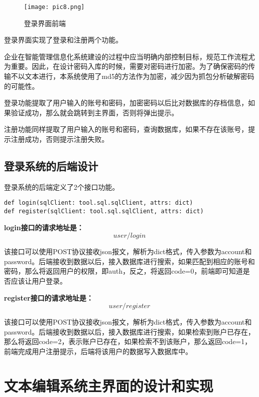 \documentclass[forprint]{software}
\begin{document}
\begin{figure}[!htbp]
	\centering
	\texttt{[image: pic8.png]}
	\caption{登录界面前端}
	\label{fig:8}
\end{figure}

登录界面实现了登录和注册两个功能。

企业在智能管理信息化系统建设的过程中应当明确内部控制目标，规范工作流程尤为重要。因此，在设计密码入库的时候，需要对密码进行加密。为了确保密码的传输不以文本进行，本系统使用了md5的方法作为加密，减少因为抓包分析破解密码的可能性。

登录功能提取了用户输入的账号和密码，加密密码以后比对数据库的存档信息，如果验证成功，那么就会跳转到主界面，否则将弹出提示。

注册功能同样提取了用户输入的账号和密码，查询数据库，如果不存在该账号，提示注册成功，否则提示注册失败。

\subsection{登录系统的后端设计}

登录系统的后端定义了2个接口功能。

\begin{lstlisting}
def login(sqlClient: tool.sql.sqlClient, attrs: dict)
def register(sqlClient: tool.sql.sqlClient, attrs: dict)
\end{lstlisting}

\textbf{login接口的请求地址是：}
\begin{equation*}
	user/login
\end{equation*}

该接口可以使用POST协议接收json报文，解析为dict格式，传入参数为account和password。后端接收到数据以后，接入数据库进行搜索，如果匹配到相应的账号和密码，那么将返回用户的权限，即auth，反之，将返回code=0，前端即可知道是否应该让用户登录。

\textbf{register接口的请求地址是：}
\begin{equation*}
	user/register
\end{equation*}

该接口可以使用POST协议接收json报文，解析为dict格式，传入参数为account和password。后端接收到数据以后，接入数据库进行搜索，如果检索到账户已存在，那么将返回code=2，表示账户已存在，如果检索不到该账户，那么返回code=1，前端完成用户注册提示，后端将该用户的数据写入数据库中。

\section{文本编辑系统主界面的设计和实现}
\end{document}
